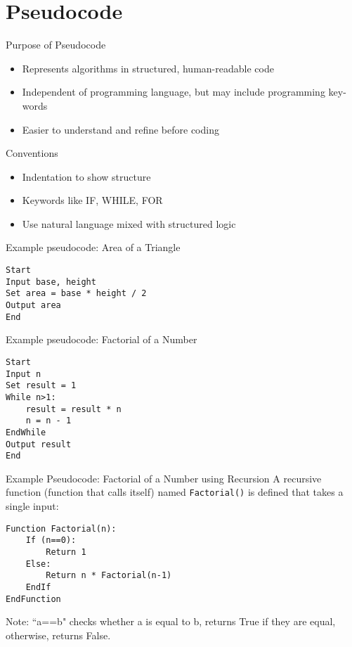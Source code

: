 \documentclass[12pt, aspectratio=169]{beamer}
\begin{document}
    \section{Pseudocode}


    \begin{frame}{Purpose of Pseudocode}
        \begin{itemize}
            \item Represents algorithms in structured, human-readable code
            \item Independent of programming language, but may include programming key-words
            \item Easier to understand and refine before coding
        \end{itemize}
    \end{frame}


    \begin{frame}{Conventions}
        \begin{itemize}
            \item Indentation to show structure
            \item Keywords like IF, WHILE, FOR
            \item Use natural language mixed with structured logic
        \end{itemize}
    \end{frame}


    \begin{frame}[fragile]{Example pseudocode: Area of a Triangle}
        \begin{verbatim}
Start
Input base, height
Set area = base * height / 2
Output area
End
        \end{verbatim}    
    \end{frame}


    \begin{frame}[fragile]{Example pseudocode: Factorial of a Number}
        \begin{verbatim}
Start
Input n
Set result = 1
While n>1:
    result = result * n
    n = n - 1
EndWhile
Output result
End
        \end{verbatim}
    \end{frame}


    \begin{frame}[fragile]{Example Pseudocode: Factorial of a Number using Recursion}
        A recursive function (function that calls itself) named \verb|Factorial()| is defined that takes a single input:\\

        \begin{verbatim}
Function Factorial(n):
    If (n==0):
        Return 1
    Else:
        Return n * Factorial(n-1)
    EndIf
EndFunction
        \end{verbatim}

        Note: ``a==b" checks whether a is equal to b, returns True if they are equal, otherwise, returns False.
    \end{frame}
\end{document}
